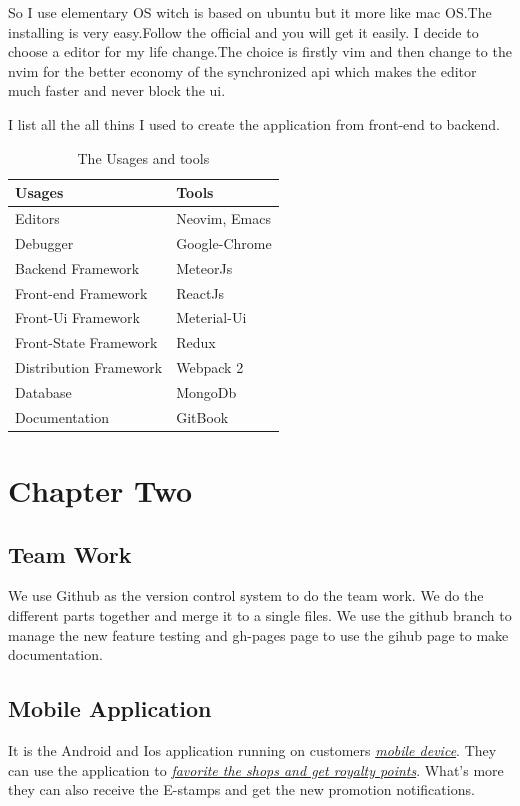 \documentclass[12pt]{scrartcl}
\begin{document}
So I use elementary OS witch is based on ubuntu but it more like mac OS.The installing is very easy.Follow the official and you will get it easily.
I decide to choose a editor for my life change.The choice is firstly vim and then change to the nvim for the better economy of the synchronized api which makes the editor much faster and never block the ui.

I list all the all thins I used to create the application from front-end to
backend.

\begin{table}[htbp]
\caption{\label{tab:org793ea79}
The Usages and tools}
\centering
\begin{tabular}{ll}
Usages & Tools\\
\hline
Editors & Neovim, Emacs\\
Debugger & Google-Chrome\\
Backend Framework & MeteorJs\\
Front-end Framework & ReactJs\\
Front-Ui Framework & Meterial-Ui\\
Front-State Framework & Redux\\
Distribution Framework & Webpack 2\\
Database & MongoDb\\
Documentation & GitBook\\
\end{tabular}
\end{table}

\newpage

\section{Chapter Two}
\label{sec:orge1da213}
\subsection{Team Work}
\label{sec:orgee16887}
We use Github as the version control system to do the team work. We do the
different parts together and merge it to a single files. We use the github
branch to manage the new feature testing and gh-pages page to use the gihub
page to make documentation.
\subsection{Mobile Application}
\label{sec:orgc5cabec}
It is the Android and Ios application running on customers \hyperref[fig:org606d639]{\emph{mobile device}}. They can
use the application to \hyperref[fig:orgedc7f17]{\emph{favorite the shops and get royalty points}}. What's more
they can also receive the E-stamps and get the new promotion notifications.
\end{document}
